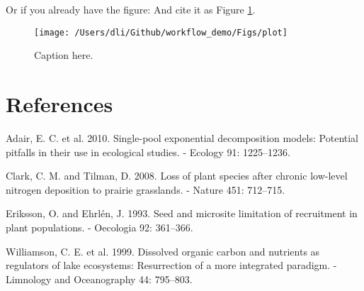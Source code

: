 \documentclass[12pt,]{article}
\begin{document}
Or if you already have the figure: And cite it as Figure \ref{fig:fig2}.

\begin{figure}

{\centering \texttt{[image: /Users/dli/Github/workflow\_demo/Figs/plot]} 

}

\caption{Caption here.}\label{fig:fig2}
\end{figure}

\clearpage

\section*{References}\label{references}

\hypertarget{refs}{}
\hypertarget{ref-adair_single-pool_2010}{}
Adair, E. C. et al. 2010. Single-pool exponential decomposition models:
Potential pitfalls in their use in ecological studies. - Ecology 91:
1225--1236.

\hypertarget{ref-clark_loss_2008}{}
Clark, C. M. and Tilman, D. 2008. Loss of plant species after chronic
low-level nitrogen deposition to prairie grasslands. - Nature 451:
712--715.

\hypertarget{ref-eriksson_seed_1993}{}
Eriksson, O. and Ehrlén, J. 1993. Seed and microsite limitation of
recruitment in plant populations. - Oecologia 92: 361--366.

\hypertarget{ref-williamson_dissolved_1999}{}
Williamson, C. E. et al. 1999. Dissolved organic carbon and nutrients as
regulators of lake ecosystems: Resurrection of a more integrated
paradigm. - Limnology and Oceanography 44: 795--803.
\end{document}
